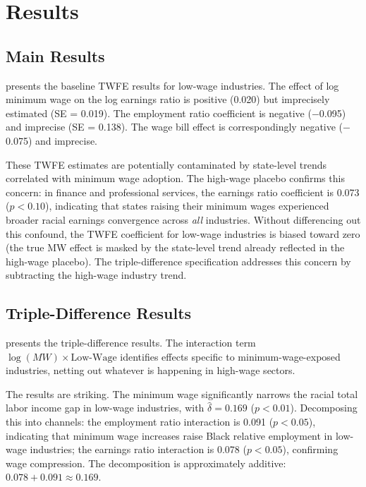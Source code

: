 \documentclass[12pt]{article}
\begin{document}
\section{Results}
\label{sec:results}

\subsection{Main Results}

 presents the baseline TWFE results for low-wage industries. The effect of log minimum wage on the log earnings ratio is positive (0.020) but imprecisely estimated (SE = 0.019). The employment ratio coefficient is negative ($-$0.095) and imprecise (SE = 0.138). The wage bill effect is correspondingly negative ($-$0.075) and imprecise.



These TWFE estimates are potentially contaminated by state-level trends correlated with minimum wage adoption. The high-wage placebo confirms this concern: in finance and professional services, the earnings ratio coefficient is 0.073 ($p < 0.10$), indicating that states raising their minimum wages experienced broader racial earnings convergence across \textit{all} industries. Without differencing out this confound, the TWFE coefficient for low-wage industries is biased toward zero (the true MW effect is masked by the state-level trend already reflected in the high-wage placebo). The triple-difference specification addresses this concern by subtracting the high-wage industry trend.

\subsection{Triple-Difference Results}

 presents the triple-difference results. The interaction term $\log(MW) \times \text{Low-Wage}$ identifies effects specific to minimum-wage-exposed industries, netting out whatever is happening in high-wage sectors.



The results are striking. The minimum wage significantly narrows the racial total labor income gap in low-wage industries, with $\hat{\delta} = 0.169$ ($p < 0.01$). Decomposing this into channels: the employment ratio interaction is 0.091 ($p < 0.05$), indicating that minimum wage increases raise Black relative employment in low-wage industries; the earnings ratio interaction is 0.078 ($p < 0.05$), confirming wage compression. The decomposition is approximately additive: $0.078 + 0.091 \approx 0.169$.
\end{document}
